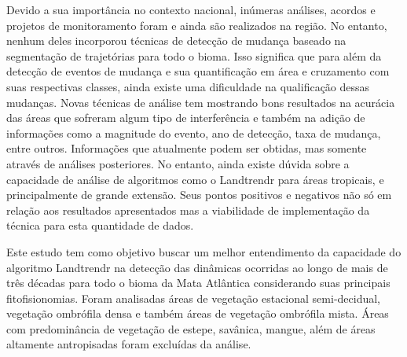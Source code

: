 Devido a sua importância no contexto nacional, inúmeras análises, acordos e projetos de monitoramento foram e ainda são realizados na região. No entanto, nenhum deles incorporou técnicas de detecção de mudança baseado na segmentação de trajetórias para todo o bioma. Isso significa que para além da detecção de eventos de mudança e sua quantificação em área e cruzamento com suas respectivas classes, ainda existe uma dificuldade na qualificação dessas mudanças. Novas técnicas de análise tem mostrando bons resultados na acurácia das áreas que sofreram algum tipo de interferência e também na adição de informações como a magnitude do evento, ano de detecção, taxa de mudança, entre outros. Informações que atualmente podem ser obtidas, mas somente através de análises posteriores. No entanto, ainda existe dúvida sobre a capacidade de análise de algoritmos como o Landtrendr para áreas tropicais, e principalmente de grande extensão. Seus pontos positivos e negativos não só em relação aos resultados apresentados mas a viabilidade de implementação da técnica para esta quantidade de dados. 



Este estudo tem como objetivo buscar um melhor entendimento da capacidade do algoritmo Landtrendr na detecção das dinâmicas ocorridas ao longo de mais de três décadas para todo o bioma da Mata Atlântica considerando suas principais fitofisionomias. Foram analisadas áreas de vegetação estacional semi-decidual, vegetação ombrófila densa e também áreas de vegetação ombrófila mista. Áreas com predominância de vegetação de estepe, savânica, mangue, além de áreas altamente antropisadas foram excluídas da análise. 

